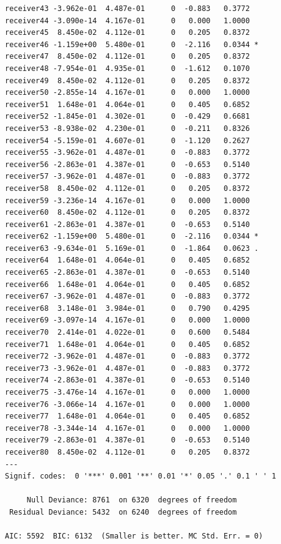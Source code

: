 \documentclass[11pt]{article}
\begin{document}
\begin{Verbatim}[commandchars=\\\{\}]
receiver43 -3.962e-01  4.487e-01      0  -0.883   0.3772    
receiver44 -3.090e-14  4.167e-01      0   0.000   1.0000    
receiver45  8.450e-02  4.112e-01      0   0.205   0.8372    
receiver46 -1.159e+00  5.480e-01      0  -2.116   0.0344 *  
receiver47  8.450e-02  4.112e-01      0   0.205   0.8372    
receiver48 -7.954e-01  4.935e-01      0  -1.612   0.1070    
receiver49  8.450e-02  4.112e-01      0   0.205   0.8372    
receiver50 -2.855e-14  4.167e-01      0   0.000   1.0000    
receiver51  1.648e-01  4.064e-01      0   0.405   0.6852    
receiver52 -1.845e-01  4.302e-01      0  -0.429   0.6681    
receiver53 -8.938e-02  4.230e-01      0  -0.211   0.8326    
receiver54 -5.159e-01  4.607e-01      0  -1.120   0.2627    
receiver55 -3.962e-01  4.487e-01      0  -0.883   0.3772    
receiver56 -2.863e-01  4.387e-01      0  -0.653   0.5140    
receiver57 -3.962e-01  4.487e-01      0  -0.883   0.3772    
receiver58  8.450e-02  4.112e-01      0   0.205   0.8372    
receiver59 -3.236e-14  4.167e-01      0   0.000   1.0000    
receiver60  8.450e-02  4.112e-01      0   0.205   0.8372    
receiver61 -2.863e-01  4.387e-01      0  -0.653   0.5140    
receiver62 -1.159e+00  5.480e-01      0  -2.116   0.0344 *  
receiver63 -9.634e-01  5.169e-01      0  -1.864   0.0623 .  
receiver64  1.648e-01  4.064e-01      0   0.405   0.6852    
receiver65 -2.863e-01  4.387e-01      0  -0.653   0.5140    
receiver66  1.648e-01  4.064e-01      0   0.405   0.6852    
receiver67 -3.962e-01  4.487e-01      0  -0.883   0.3772    
receiver68  3.148e-01  3.984e-01      0   0.790   0.4295    
receiver69 -3.097e-14  4.167e-01      0   0.000   1.0000    
receiver70  2.414e-01  4.022e-01      0   0.600   0.5484    
receiver71  1.648e-01  4.064e-01      0   0.405   0.6852    
receiver72 -3.962e-01  4.487e-01      0  -0.883   0.3772    
receiver73 -3.962e-01  4.487e-01      0  -0.883   0.3772    
receiver74 -2.863e-01  4.387e-01      0  -0.653   0.5140    
receiver75 -3.476e-14  4.167e-01      0   0.000   1.0000    
receiver76 -3.066e-14  4.167e-01      0   0.000   1.0000    
receiver77  1.648e-01  4.064e-01      0   0.405   0.6852    
receiver78 -3.344e-14  4.167e-01      0   0.000   1.0000    
receiver79 -2.863e-01  4.387e-01      0  -0.653   0.5140    
receiver80  8.450e-02  4.112e-01      0   0.205   0.8372    
---
Signif. codes:  0 '***' 0.001 '**' 0.01 '*' 0.05 '.' 0.1 ' ' 1

     Null Deviance: 8761  on 6320  degrees of freedom
 Residual Deviance: 5432  on 6240  degrees of freedom
 
AIC: 5592  BIC: 6132  (Smaller is better. MC Std. Err. = 0)
    \end{Verbatim}
\end{document}
